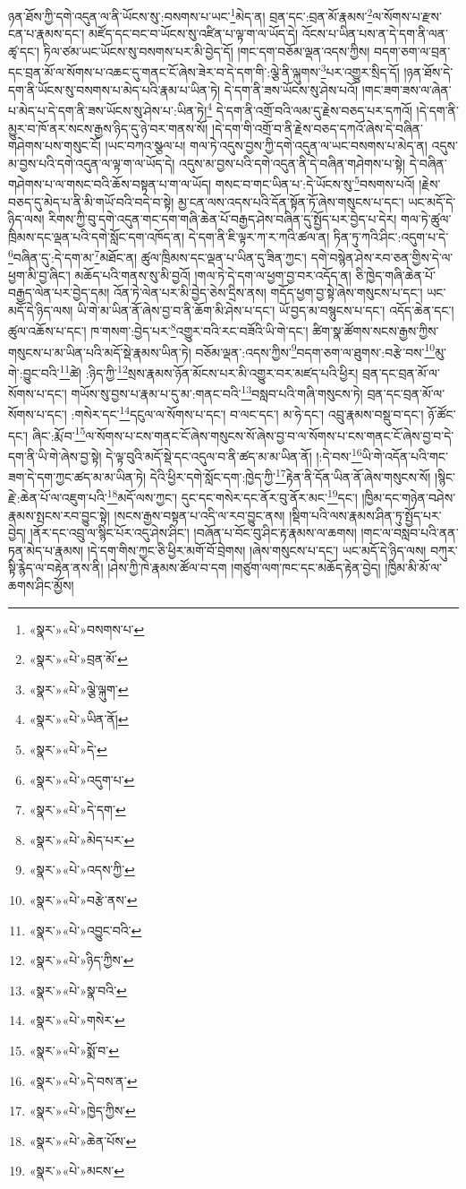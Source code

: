 ཉན་ཐོས་ཀྱི་དགེ་འདུན་ལ་ནི་ཡོངས་སུ་:བསགས་པ་ཡང་\footnote{«སྣར་»«པེ་»བསགས་པ་}མེད་ན། བྲན་དང་:བྲན་མོ་རྣམས་\footnote{«སྣར་»«པེ་»བྲན་མོ་}ལ་སོགས་པ་རྫས་ངན་པ་རྣམས་དང་། མཛོད་དང་བང་བ་ཡོངས་སུ་འཛིན་པ་ལྟ་ག་ལ་ཡོད་དེ། འོངས་པ་ཡིན་པས་ན་དེ་དག་ནི་ལན་ཚྭ་དང་། ཏིལ་ཙམ་ཡང་ཡོངས་སུ་བསགས་པར་མི་བྱེད་དོ། །གང་དག་བཅོམ་ལྡན་འདས་ཀྱིས། བདག་ཅག་ལ་བྲན་དང་བྲན་མོ་ལ་སོགས་པ་འཆང་དུ་གནང་ངོ་ཞེས་ཟེར་བ་དེ་དག་གི་:ལྕེ་ནི་ལྐུགས་\footnote{«སྣར་»«པེ་»ལྕེ་ལྐུག་}པར་འགྱུར་སྲིད་དོ། །ཉན་ཐོས་དེ་དག་ནི་ཡོངས་སུ་བསགས་པ་མེད་པའི་རྣམ་པ་ཡིན་ཏེ། དེ་དག་ནི་ཟས་ཡོངས་སུ་ཤེས་པའོ། །གང་ཟག་ཟས་ལ་ཞེན་པ་མེད་པ་དེ་དག་ནི་ཟས་ཡོངས་སུ་ཤེས་པ་:ཡིན་ཏེ།\footnote{«སྣར་»«པེ་»ཡིན་ནོ།} དེ་དག་ནི་འགྲོ་བའི་ལམ་དུ་རྗེས་བཅད་པར་དཀའོ། །དེ་དག་ནི་མྱུར་བ་ཁོ་ནར་སངས་རྒྱས་ཉིད་དུ་ཉེ་བར་གནས་སོ། །དེ་དག་གི་འགྲོ་བ་ནི་རྗེས་བཅད་དཀའོ་ཞེས་དེ་བཞིན་གཤེགས་པས་གསུང་ངོ། །ཡང་བཀའ་སྩལ་པ། གལ་ཏེ་འདུས་བྱས་ཀྱི་དགེ་འདུན་ལ་ཡང་བསགས་པ་མེད་ན། འདུས་མ་བྱས་པའི་དགེ་འདུན་ལ་ལྟ་ག་ལ་ཡོད་དེ། འདུས་མ་བྱས་པའི་དགེ་འདུན་ནི་དེ་བཞིན་གཤེགས་པ་སྟེ། དེ་བཞིན་གཤེགས་པ་ལ་གསང་བའི་ཆོས་བསྟན་པ་ག་ལ་ཡོད། གསང་བ་གང་ཡིན་པ་:དེ་ཡོངས་སུ་\footnote{«སྣར་»«པེ་»དེ་}བསགས་པའོ། །རྗེས་བཅད་དུ་མེད་པ་ནི་མི་གཡོ་བའི་བདེ་བ་སྟེ། མྱ་ངན་ལས་འདས་པའི་དོན་སྟོན་ཏོ་ཞེས་གསུངས་པ་དང་། ཡང་མདོ་དེ་ཉིད་ལས། རིགས་ཀྱི་བུ་དགེ་འདུན་གང་དག་གཞི་ཆེན་པོ་བརྒྱད་ཤེས་བཞིན་དུ་སྤྱོད་པར་བྱེད་པ་དེར། གལ་ཏེ་ཚུལ་ཁྲིམས་དང་ལྡན་པའི་དགེ་སློང་དག་འཁོད་ན། དེ་དག་ནི་ཇི་ལྟར་ཀ་ར་ཀའི་ཚལ་ན། ཏིན་ཏུ་ཀའི་ཤིང་:འདུག་པ་དེ་\footnote{«སྣར་»«པེ་»འདུག་པ་}བཞིན་དུ་:དེ་དག་མ་\footnote{«སྣར་»«པེ་»དེ་དག་}མཐོང་ན། ཚུལ་ཁྲིམས་དང་ལྡན་པ་ཡིན་དུ་ཟིན་ཀྱང་། དགེ་བསྙེན་ཤེས་རབ་ཅན་གྱིས་དེ་ལ་ཕྱག་མི་བྱ་ཞིང་། མཆོད་པའི་གནས་སུ་མི་བྱའོ། །གལ་ཏེ་དེ་དག་ལ་ཕྱག་བྱ་བར་འདོད་ན། ཅི་ཁྱེད་གཞི་ཆེན་པོ་བརྒྱད་ལེན་པར་བྱེད་དམ། འོན་ཏེ་ལེན་པར་མི་བྱེད་ཅེས་དྲིས་ནས། གདོད་ཕྱག་བྱ་སྟེ་ཞེས་གསུངས་པ་དང་། ཡང་མདོ་དེ་ཉིད་ལས། ཡི་གེ་མ་ཡིན་ནོ་ཞེས་བྱ་བ་ནི་ཆོག་མི་ཤེས་པ་དང་། ཡོ་བྱད་མ་བསྙུངས་པ་དང་། འདོད་ཆེན་དང་། ཚུལ་འཆོས་པ་དང་། ཁ་གསག་:བྱེད་པར་\footnote{«སྣར་»«པེ་»མེད་པར་}འགྱུར་བའི་རང་བཟོའི་ཡི་གེ་དང་། ཚིག་སྣ་ཚོགས་སངས་རྒྱས་ཀྱིས་གསུངས་པ་མ་ཡིན་པའི་མདོ་སྡེ་རྣམས་ཡིན་ཏེ། བཅོམ་ལྡན་:འདས་ཀྱིས་\footnote{«སྣར་»«པེ་»འདས་ཀྱི་}བདག་ཅག་ལ་ཐུགས་:བརྩེ་བས་\footnote{«སྣར་»«པེ་»བརྩེ་ནས་}མུ་གེ་:བྱུང་བའི་\footnote{«སྣར་»«པེ་»འབྱུང་བའི་}ཚེ། :ཉིད་ཀྱི་\footnote{«སྣར་»«པེ་»ཉིད་ཀྱིས་}སྲས་རྣམས་ཉོན་མོངས་པར་མི་འགྱུར་བར་མཛད་པའི་ཕྱིར། བྲན་དང་བྲན་མོ་ལ་སོགས་པ་དང་། གཡོས་སུ་བྱས་པ་རྣམ་པ་དུ་མ་:གནང་བའི་\footnote{«སྣར་»«པེ་»སྣ་བའི་}བསླབ་པའི་གཞི་གསུངས་ཏེ། བྲན་དང་བྲན་མོ་ལ་སོགས་པ་དང་། :གསེར་དང་\footnote{«སྣར་»«པེ་»གསེར་}དངུལ་ལ་སོགས་པ་དང་། བ་ལང་དང་། མ་ཧེ་དང་། འབྲུ་རྣམས་བསྡུ་བ་དང་། ཉོ་ཚོང་དང་། ཞིང་:རྨོ་བ་\footnote{«སྣར་»«པེ་»སྨོ་བ་}ལ་སོགས་པ་ངས་གནང་ངོ་ཞེས་གསུངས་སོ་ཞེས་བྱ་བ་ལ་སོགས་པ་ངས་གནང་ངོ་ཞེས་བྱ་བ་དེ་དག་ནི་ཡི་གེ་ཞེས་བྱ་སྟེ། དེ་ལྟ་བུའི་མདོ་སྡེ་དང་འདུལ་བ་ནི་ཚད་མ་མ་ཡིན་ནོ། །:དེ་བས་\footnote{«སྣར་»«པེ་»དེ་བས་ན་}ཡི་གེ་འདོན་པའི་གང་ཟག་དེ་དག་ཀྱང་ཚད་མ་མ་ཡིན་ཏེ། དེའི་ཕྱིར་དགེ་སློང་དག་:ཁྱེད་ཀྱི་\footnote{«སྣར་»«པེ་»ཁྱེད་ཀྱིས་}རྟེན་ནི་དོན་ཡིན་ནོ་ཞེས་གསུངས་སོ། །སྙིང་རྗེ་:ཆེན་པོ་ལ་འཇུག་པའི་\footnote{«སྣར་»«པེ་»ཆེན་པོས་}མདོ་ལས་ཀྱང་། དུང་དང་གསེར་དང་ནོར་བུ་ནོར་མང་\footnote{«སྣར་»«པེ་»མངས་}དང་། །ཁྱིམ་དང་གཉེན་བཤེས་རྣམས་སྤངས་རབ་བྱུང་སྟེ། །སངས་རྒྱས་བསྟན་པ་འདི་ལ་རབ་བྱུང་ནས། །སྡིག་པའི་ལས་རྣམས་ཤིན་ཏུ་སྤྱོད་པར་བྱེད། །ནོར་དང་འབྲུ་ལ་སྙིང་པོར་འདུ་ཤེས་ཤིང་། །བཞོན་པ་བོང་བུ་ཤིང་རྟ་རྣམས་ལ་ཆགས། །གང་ལ་བསླབ་པའི་ནན་ཏན་མེད་པ་རྣམས། །དེ་དག་གིས་ཀྱང་ཅི་ཕྱིར་མགོ་བོ་བྲེགས། །ཞེས་གསུངས་པ་དང་། ཡང་མདོ་དེ་ཉིད་ལས། བཀུར་སྟི་རྙེད་ལ་བརྟེན་ནས་ནི། །ཤེས་ཀྱི་ཁེ་རྣམས་ཚོལ་བ་དག །གཙུག་ལག་ཁང་དང་མཆོད་རྟེན་བྱེད། །ཁྱིམ་མི་མོ་ལ་ཆགས་ཤིང་མྱོས། 